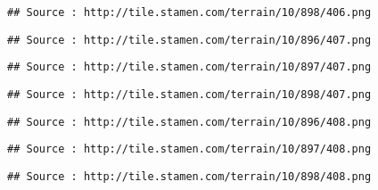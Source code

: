 \documentclass[
  xelatex,ja=standard]{bxjsarticle}
\begin{document}
\begin{verbatim}
## Source : http://tile.stamen.com/terrain/10/898/406.png
\end{verbatim}

\begin{verbatim}
## Source : http://tile.stamen.com/terrain/10/896/407.png
\end{verbatim}

\begin{verbatim}
## Source : http://tile.stamen.com/terrain/10/897/407.png
\end{verbatim}

\begin{verbatim}
## Source : http://tile.stamen.com/terrain/10/898/407.png
\end{verbatim}

\begin{verbatim}
## Source : http://tile.stamen.com/terrain/10/896/408.png
\end{verbatim}

\begin{verbatim}
## Source : http://tile.stamen.com/terrain/10/897/408.png
\end{verbatim}

\begin{verbatim}
## Source : http://tile.stamen.com/terrain/10/898/408.png
\end{verbatim}
\end{document}
